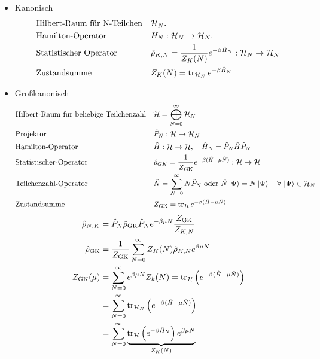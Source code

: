 \begin{itemize}
  \item Kanonisch 
    \begin{align*}
        & \text{Hilbert-Raum f\"ur N-Teilchen} && \mathcal{H}_N. \\
        & \text{Hamilton-Operator } && H_N:\mathcal{H}_N \to \mathcal{H}_N. \\
        & \text{Statistischer Operator} && \hat{\rho}_{K, N} = \frac{1}{Z_K(N)}  
        e^{-\beta \hat{H}_N} : \mathcal{H}_N \to \mathcal{H}_N \\
               & \text{Zustandsumme } && Z_K(N)= \operatorname{tr}_{\mathcal{H}_N} e ^{-\beta \hat{H}_N} \\
    \end{align*}

  \item Gro\ss{}kanonisch
      \begin{align*}
          & \text{Hilbert-Raum f\"ur beliebige Teilchenzahl}  &&
          \mathcal{H} = \bigoplus_{N=0}^{\infty} \mathcal{H}_N \\
          & \text{Projektor } &&  \hat{P}_N : \mathcal{H} \to \mathcal{H}_N \\
          & \text{Hamilton-Operator } &&  \hat{H}: \mathcal{H} \to \mathcal{H}, \quad
          \hat{H}_N = \hat{P}_N \hat{H} \hat{P}_N \\
          & \text{Statistischer-Operator } &&
          \hat{\rho}_{GK} = \frac{1}{Z_{\text{GK}}} e^{-\beta (\hat{H} - 
          \mu \hat{N})}: \mathcal{H}\to \mathcal{H} \\
          & \text{Teilchenzahl-Operator } &&  \hat{N} = \sum_{N=0}^{\infty} N
          \hat{P}_N \text{ oder } \hat{N} \Ket{\Psi} = N \Ket{\Psi}
          \quad\forall\, \Ket{\Psi} \in \mathcal{H}_N \\
          & \text{Zustandsumme } &&  Z_{\text{GK}} = \operatorname{tr}_{\mathcal{H}} 
          e^{- \beta (\hat{H} - \mu \hat{N})}
      \end{align*}
      \begin{align*}
          \hat{\rho}_{N, K}& = \hat{P}_N \hat{\rho}_{\text{GK}} \hat{P}_N
          e^{- \beta \mu N} \frac{Z_{\text{GK}}}{Z_{K,N}} \\
          \hat{\rho}_{\text{GK}} & = \frac{1}{Z_{\text{GK}}} \sum_{N=0}^{\infty}
          Z_K (N) \hat{\rho}_{K, N} e^{\beta \mu N} \\
          Z_{\text{GK}} (\mu)  & = \sum_{N = 0}^{ \infty} e^{\beta \mu N} Z_k(N) 
          = \operatorname{tr}_{\mathcal{H}} \left( e^{-\beta(\hat{H} - \mu \hat{N})}  \right) \\
          & = \sum_{N=0}^{ \infty} \operatorname{tr}_{\mathcal{H}_N} 
          \left( e^{-\beta(\hat{H} - \mu \hat{N})} \right)  \\
          & = \sum_{N=0}^{\infty} 
          \underbrace{\operatorname{tr}_{\mathcal{H}} \left( e^{-\beta \hat{H}_N} \right) e^{\beta \mu N}}_{Z_K(N)}
      \end{align*}
\end{itemize}
